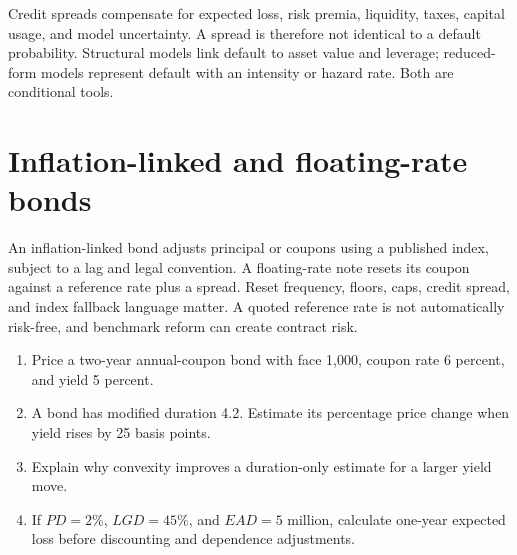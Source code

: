 Credit spreads compensate for expected loss, risk premia, liquidity, taxes, capital usage, and model uncertainty. A spread is therefore not identical to a default probability. Structural models link default to asset value and leverage; reduced-form models represent default with an intensity or hazard rate. Both are conditional tools.

\section{Inflation-linked and floating-rate bonds}
An inflation-linked bond adjusts principal or coupons using a published index, subject to a lag and legal convention. A floating-rate note resets its coupon against a reference rate plus a spread. Reset frequency, floors, caps, credit spread, and index fallback language matter. A quoted reference rate is not automatically risk-free, and benchmark reform can create contract risk.

\begin{exerciseblock}
\begin{enumerate}
  \item Price a two-year annual-coupon bond with face 1,000, coupon rate 6 percent, and yield 5 percent.
  \item A bond has modified duration 4.2. Estimate its percentage price change when yield rises by 25 basis points.
  \item Explain why convexity improves a duration-only estimate for a larger yield move.
  \item If $PD=2\%$, $LGD=45\%$, and $EAD=5$ million, calculate one-year expected loss before discounting and dependence adjustments.
\end{enumerate}
\end{exerciseblock}

